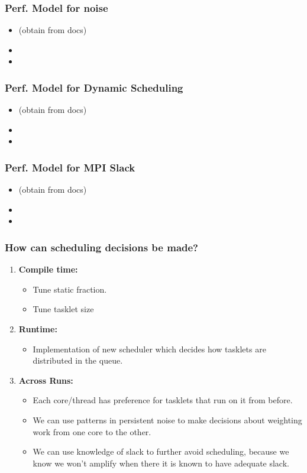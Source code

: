 \begin{frame}
\frametitle{Perf. Model for noise}  
\begin{itemize} 
\item \small (obtain from docs)
\item 
\item 
\end{itemize}
\end{frame}


\begin{frame}
\frametitle{Perf. Model for Dynamic Scheduling}  
\begin{itemize} 
\item \small (obtain from docs)
\item 
\item 
\end{itemize}
\end{frame} 

\begin{frame}
\frametitle{Perf. Model for MPI Slack}  
\begin{itemize} 
\item \small (obtain from docs)
\item \small 
\item \small 
\end{itemize}
\end{frame} 


\begin{frame}
\frametitle {How can scheduling decisions be made? }
\begin{enumerate}
\item \small \textbf{Compile time:} 
\begin{itemize} 
\item \tiny Tune static fraction. 
\item \tiny Tune tasklet size
\end{itemize}
\item \small \textbf{Runtime:}
\begin{itemize} 

\item \tiny Implementation of new scheduler which decides how tasklets are distributed in the queue. 
\end{itemize}
\item \small \textbf{Across Runs:}
\begin{itemize} 
\item \tiny Each core/thread has preference for tasklets that run on it from before.  
\item \tiny We can use patterns in persistent noise to make decisions
  about weighting work from one core to the other. 
\item \tiny We can use knowledge of slack to further avoid scheduling,
  because we know we won't amplify when there it is known to have
  adequate slack. 
\end{itemize}
\end{enumerate}
\end{frame}

